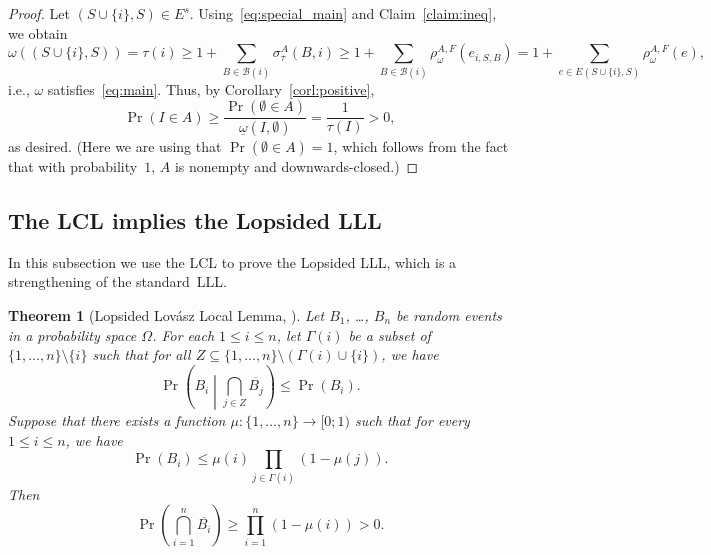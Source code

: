 \documentclass[10pt]{article}
\numberwithin{equation}{subsection}
\newtheorem{theo}{Theorem}[section]
\theoremstyle{definition}
\begin{document}
\begin{proof}
		Let $(S \cup \{i\}, S) \in E^s$. Using~\eqref{eq:special_main} and Claim~\ref{claim:ineq}, we obtain
		$$
			\omega((S \cup \{i\}, S)) = \tau(i) \geq 1 + \sum_{B \in \mathcal{B}(i)} \sigma^A_\tau(B, i) \geq 1 + \sum_{B \in \mathcal{B}(i)} \rho^{A, F}_\omega(e_{i, S, B}) = 1 + \sum_{e \in E(S \cup \{i\}, S)} \rho^{A, F}_\omega(e),
		$$
		i.e., $\omega$ satisfies~\eqref{eq:main}. Thus, by Corollary~\ref{corl:positive},
		$$
			\Pr(I \in A) \geq \frac{\Pr(\emptyset \in A)}{\underline{\omega}(I, \emptyset)} = \frac{1}{\tau(I)} > 0,
		$$
		as desired. (Here we are using that $\Pr(\emptyset \in A) = 1$, which follows from the fact that with probability~$1$, $A$ is nonempty and downwards-closed.)
	\end{proof}
	
	\subsection{The LCL implies the Lopsided LLL}\label{subsec:LLL}
	
	In this subsection we use the LCL to prove the Lopsided LLL, which is a strengthening of the standard~LLL.
	
	\begin{theo}[Lopsided Lov\'{a}sz Local Lemma, \cite{Erdos}]
		Let $B_1$, \ldots, $B_n$ be random events in a probability space $\Omega$. For each $1 \leq i \leq n$, let $\Gamma(i)$ be a subset of $\{1, \ldots, n\} \setminus \{i\}$ such that for all $Z \subseteq \{1, \ldots, n\} \setminus (\Gamma(i) \cup \{i\})$, we have
		\begin{equation}\label{eq:LopLLLcond}
		\Pr\left(B_i \middle\vert \bigcap_{j \in Z} \overline{B_j} \right) \leq \Pr(B_i).
		\end{equation}
		Suppose that there exists a function $\mu\colon \{1, \ldots, n\}\to[0;1)$ such that for every $1 \leq i \leq n$, we have
		\begin{equation}\label{eq:LopLLL}
		\Pr(B_i)\leq \mu(i) \prod_{j \in \Gamma(i)}(1-\mu(j)).
		\end{equation}
		Then
		$$
		\Pr\left(\bigcap_{i = 1}^n\overline{B_i}\right) \geq \prod_{i  = 1}^n(1 - \mu(i)) > 0.
		$$
	\end{theo}
	
\end{document}
